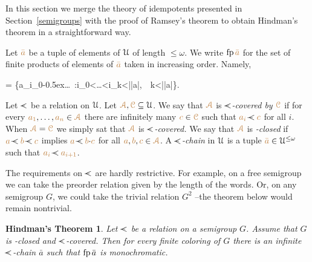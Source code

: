In this section we merge the theory of idempotents presented in Section~\ref{semigroups}
with the proof of Ramsey's theorem to obtain Hindman's theorem in a straightforward way.

Let ${\color{brown}\bar a}$ be a tuple of elements of $\EuScript U$ of length $\le\omega$.
We write ${\rm fp}\,{\color{brown}\bar a}$ for the set of finite products of elements 
of ${\color{brown}\bar a}$ taken in increasing order. 
Namely, 

{=}
{\Big\{{\mr a_{i_0}}\kern-0.5ex\cdot\dots{}\ :\quad i_0<\dots<i_k<|{\mr\bar a}|,\ \ k<|{\mr\bar a}|\Big\}}. 

% 
% 
\bigskip
Let \emph{$\cpaw$\/} be a relation on $\EuScript U$.
Let ${\color{brown}\EuScript A},{\color{brown}\EuScript C}\subseteq\EuScript U$.
We say that ${\color{brown}\EuScript A}$ is \emph{$\cpaw$-covered by ${\color{brown}\EuScript C}$\/} 
if for every ${\color{brown} a_1},\dots,{\color{brown} a_n}\in{\color{brown}\EuScript A}$ there are infinitely many ${\color{brown} c}\in{\color{brown}\EuScript C}$ such that ${\mr a_i}\cpaw{\mr c}$ for all $i$.
When ${\color{brown}\EuScript A}={\color{brown}\EuScript C}$ we simply sat that ${\color{brown}\EuScript A}$ is \emph{$\cpaw$-covered.}
We say that ${\color{brown}\EuScript A}$ is \emph{\cpawdot-closed\/} 
if ${\mr a}\cpaw{\mr b}\cpaw{\mr c}$ implies ${\mr a}\cpaw{\mr b}{\cdot}{\mr c}$ 
for all ${\color{brown} a},{\color{brown} b},{\color{brown} c}\in{\color{brown}\EuScript A}$.
A \emph{$\cpaw$-chain\/} in $\EuScript U$ is a tuple ${\color{brown}\bar a}\in\EuScript U^{\le\omega}$ such that ${\mr a_i}\cpaw{\mr a_{i+1}}$.

The requirements on  $\cpaw$ are hardly restrictive.
For example, on a free semigroup we can take the preorder relation given by the length of the words.
%
Or, on any semigroup $G$, we could take the trivial relation $G^2$ --the theorem below would remain nontrivial.

\theoremstyle{mio}
\newtheorem{Hindman}[thm]{Hindman's Theorem}
\begin{Hindman}\label{thm_Hindman}
Let $\cpaw$ be a relation on a semigroup $G$.
%
Assume that $G$ is  \cpawdot-closed and $\cpaw$-covered.
%
Then for every finite coloring of $G$ 
there is an infinite $\cpaw$-chain $\bar a$ such that ${\rm fp}\,\bar a$ is monochromatic.
\end{Hindman}


